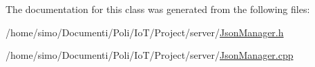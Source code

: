 The documentation for this class was generated from the following files\+:\begin{DoxyCompactItemize}
\item 
/home/simo/\+Documenti/\+Poli/\+Io\+T/\+Project/server/\hyperlink{_json_manager_8h}{Json\+Manager.\+h}\item 
/home/simo/\+Documenti/\+Poli/\+Io\+T/\+Project/server/\hyperlink{_json_manager_8cpp}{Json\+Manager.\+cpp}\end{DoxyCompactItemize}
